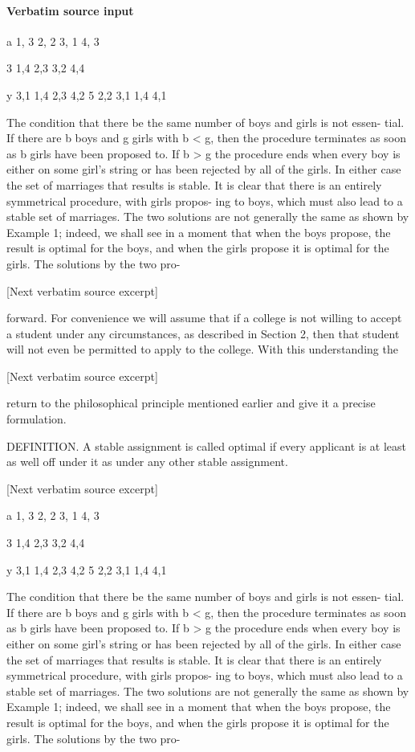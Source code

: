 \documentclass[10pt]{article}
\begin{document}
\paragraph{Verbatim source input}
\begin{ReviewVerbatim}
a 1, 3 2, 2 3, 1 4, 3

                             3 1,4 2,3 3,2 4,4

                            y 3,1 1,4 2,3 4,2
                            5 2,2 3,1 1,4 4,1


   The condition that there be the same number of boys and girls is not essen-
tial. If there are b boys and g girls with b < g, then the procedure terminates as
soon as b girls have been proposed to. If b > g the procedure ends when every
boy is either on some girl's string or has been rejected by all of the girls. In
either case the set of marriages that results is stable.
   It is clear that there is an entirely symmetrical procedure, with girls propos-
ing to boys, which must also lead to a stable set of marriages. The two solutions
are not generally the same as shown by Example 1; indeed, we shall see in a
moment that when the boys propose, the result is optimal for the boys, and
when the girls propose it is optimal for the girls. The solutions by the two pro-

[Next verbatim source excerpt]

forward. For convenience we will assume that if a college is not willing to accept
a student under any circumstances, as described in Section 2, then that student
will not even be permitted to apply to the college. With this understanding the

[Next verbatim source excerpt]

return to the philosophical principle mentioned earlier and give it a precise
formulation.

   DEFINITION. A stable assignment is called optimal if every applicant is at least
as well off under it as under any other stable assignment.


[Next verbatim source excerpt]

                            a 1, 3 2, 2 3, 1 4, 3

                             3 1,4 2,3 3,2 4,4

                            y 3,1 1,4 2,3 4,2
                            5 2,2 3,1 1,4 4,1


   The condition that there be the same number of boys and girls is not essen-
tial. If there are b boys and g girls with b < g, then the procedure terminates as
soon as b girls have been proposed to. If b > g the procedure ends when every
boy is either on some girl's string or has been rejected by all of the girls. In
either case the set of marriages that results is stable.
   It is clear that there is an entirely symmetrical procedure, with girls propos-
ing to boys, which must also lead to a stable set of marriages. The two solutions
are not generally the same as shown by Example 1; indeed, we shall see in a
moment that when the boys propose, the result is optimal for the boys, and
when the girls propose it is optimal for the girls. The solutions by the two pro-


\end{ReviewVerbatim}
\end{document}
